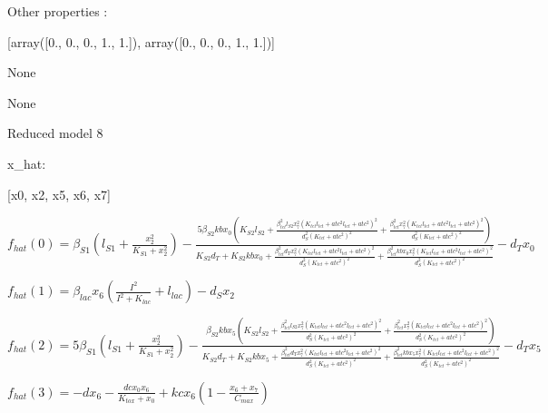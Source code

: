 Other properties :


[array([0., 0., 0., 1., 1.]), array([0., 0., 0., 1., 1.])]

None

None

Reduced model 8

x_{hat}: 

[x0, x2, x5, x6, x7]


$f_{hat}(0)=\beta_{S1} \left(l_{S1} + \frac{x_{2}^{2}}{K_{S1} + x_{2}^{2}}\right) - \frac{5 \beta_{S2} kb x_{0} \left(K_{S2} l_{S2} + \frac{\beta_{tet}^{2} l_{S2} x_{7}^{2} \left(K_{tet} l_{tet} + atc^{2} l_{tet} + atc^{2}\right)^{2}}{d_{S}^{2} \left(K_{tet} + atc^{2}\right)^{2}} + \frac{\beta_{tet}^{2} x_{7}^{2} \left(K_{tet} l_{tet} + atc^{2} l_{tet} + atc^{2}\right)^{2}}{d_{S}^{2} \left(K_{tet} + atc^{2}\right)^{2}}\right)}{K_{S2} d_{T} + K_{S2} kb x_{0} + \frac{\beta_{tet}^{2} d_{T} x_{7}^{2} \left(K_{tet} l_{tet} + atc^{2} l_{tet} + atc^{2}\right)^{2}}{d_{S}^{2} \left(K_{tet} + atc^{2}\right)^{2}} + \frac{\beta_{tet}^{2} kb x_{0} x_{7}^{2} \left(K_{tet} l_{tet} + atc^{2} l_{tet} + atc^{2}\right)^{2}}{d_{S}^{2} \left(K_{tet} + atc^{2}\right)^{2}}} - d_{T} x_{0}$


$f_{hat}(1)=\beta_{lac} x_{6} \left(\frac{I^{2}}{I^{2} + K_{lac}} + l_{lac}\right) - d_{S} x_{2}$


$f_{hat}(2)=5 \beta_{S1} \left(l_{S1} + \frac{x_{2}^{2}}{K_{S1} + x_{2}^{2}}\right) - \frac{\beta_{S2} kb x_{5} \left(K_{S2} l_{S2} + \frac{\beta_{tet}^{2} l_{S2} x_{7}^{2} \left(K_{tet} l_{tet} + atc^{2} l_{tet} + atc^{2}\right)^{2}}{d_{S}^{2} \left(K_{tet} + atc^{2}\right)^{2}} + \frac{\beta_{tet}^{2} x_{7}^{2} \left(K_{tet} l_{tet} + atc^{2} l_{tet} + atc^{2}\right)^{2}}{d_{S}^{2} \left(K_{tet} + atc^{2}\right)^{2}}\right)}{K_{S2} d_{T} + K_{S2} kb x_{5} + \frac{\beta_{tet}^{2} d_{T} x_{7}^{2} \left(K_{tet} l_{tet} + atc^{2} l_{tet} + atc^{2}\right)^{2}}{d_{S}^{2} \left(K_{tet} + atc^{2}\right)^{2}} + \frac{\beta_{tet}^{2} kb x_{5} x_{7}^{2} \left(K_{tet} l_{tet} + atc^{2} l_{tet} + atc^{2}\right)^{2}}{d_{S}^{2} \left(K_{tet} + atc^{2}\right)^{2}}} - d_{T} x_{5}$


$f_{hat}(3)=- d x_{6} - \frac{dc x_{0} x_{6}}{K_{tox} + x_{0}} + kc x_{6} \left(1 - \frac{x_{6} + x_{7}}{C_{max}}\right)$


